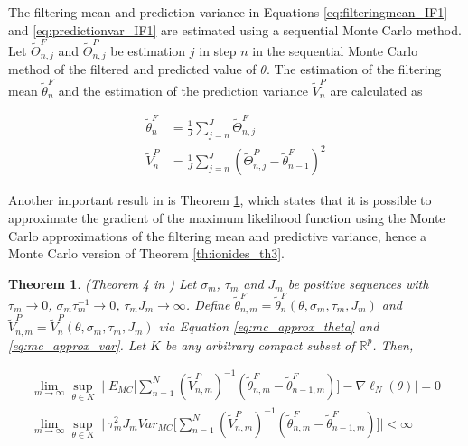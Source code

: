 \documentclass[twoside,openright]{report}
\newtheorem{theorem}{Theorem}[section]
\begin{document}
The filtering mean and prediction variance in Equations \ref{eq:filteringmean_IF1} and \ref{eq:predictionvar_IF1} are estimated using a sequential Monte Carlo method. Let  $\widetilde{\Theta}_{n,j}^{F}$ and $\widetilde{\Theta}_{n,j}^{P}$ be  estimation $j$ in step $n$ in the sequential Monte Carlo method of the filtered and predicted value of $\theta$. The estimation of the filtering mean  $\widetilde{\theta}^{F}_n$  and the estimation of the prediction variance $\widetilde{V}^{P}_n$ are calculated as

\begin{align}
    \widetilde{\theta}^{F}_n &= \frac{1}{J} \sum_{j = n}^{J} \widetilde{\Theta}_{n,j}^{F} \label{eq:mc_approx_theta}\\
    \widetilde{V}^{P}_n &= \frac{1}{J} \sum_{j = n}^{J} ( \widetilde{\Theta}_{n,j}^{P} -  \widetilde{\theta}^{F}_{n-1} )^2 \label{eq:mc_approx_var} 
\end{align}

Another important result in \cite{ionides2011iterated} is Theorem \ref{th:ionides_th4}, which states that it is possible to approximate the gradient of the maximum likelihood function using the Monte Carlo approximations of the filtering mean and predictive variance, hence a Monte Carlo version of Theorem \ref{th:ionides_th3}. 

\begin{theorem} \label{th:ionides_th4}
(Theorem 4 in \cite{ionides2011iterated}) Let $\sigma_m$, $\tau_m$ and $J_m$ be positive sequences with $\tau_m \to 0$, $\sigma_m \tau_m ^{-1} \to 0 $, $\tau_m J_m \to \infty $. Define $\widetilde{\theta}^{F}_{n,m} = \widetilde{\theta}^{F}_{n} (\theta, \sigma_m , \tau_m , J_m)$ and $\widetilde{V}^{P}_{n,m} = \widetilde{V}^{P}_{n} (\theta, \sigma_m , \tau_m , J_m)$ via Equation \ref{eq:mc_approx_theta} and \ref{eq:mc_approx_var}. Let $K$ be any arbitrary compact subset of $\mathbb{R}^{p}$. Then,

\begin{align}
   \lim_{m \to \infty}  \sup_{\theta \in K} \mid E_{MC} \Big[ \sum_{n=1}^{N} ( \widetilde{V}_{n,m}^{P} )^{-1} (\widetilde{\theta}_{n,m}^{F}  - \widetilde{\theta}_{n-1,m}^{F})  \Big]  - \nabla \ell _{N}(\theta) \mid = 0  \\
   \lim_{m \to \infty} \sup_{\theta \in K} \mid \tau_{m}^{2} J_m Var_{MC} \Big[  \sum_{n=1}^{N} ( \widetilde{V}_{n,m}^{P} )^{-1} (\widetilde{\theta}_{n,m}^{F}  - \widetilde{\theta}_{n-1,m}^{F})  \Big] \mid < \infty
\end{align}
\end{theorem}
\end{document}
